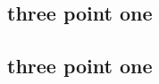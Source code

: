 \documentclass[12pt]{article}
\begin{document}

\subsection{three point one}


\subsection{three point one}

\end{document}
